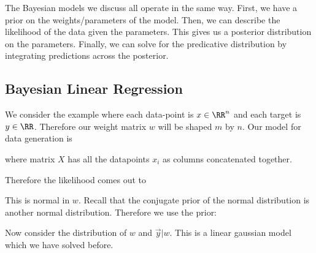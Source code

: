 \documentclass[12pt]{article}
\begin{document}
The Bayesian models we discuss all operate in the same way. First, we have a prior on the weights/parameters of the model. Then, we can describe the likelihood of the data given the parameters. This gives us a posterior distribution on the parameters. Finally, we can solve for the predicative distribution by integrating predictions across the posterior. 

\subsection{Bayesian Linear Regression}

We consider the example where each data-point is $x \in \RR^n$ and each target is $y \in \RR$. Therefore our weight matrix $w$ will be shaped $m$ by $n$. Our model for data generation is


where matrix $X$ has all the datapoints $x_i$ as columns concatenated together.

Therefore the likelihood comes out to


This is normal in $w$. Recall that the conjugate prior of the normal distribution is another normal distribution. Therefore we use the prior:


Now consider the distribution of $w$ and $\vec y | w$. This is a linear gaussian model which we have solved before. 

\end{document}
